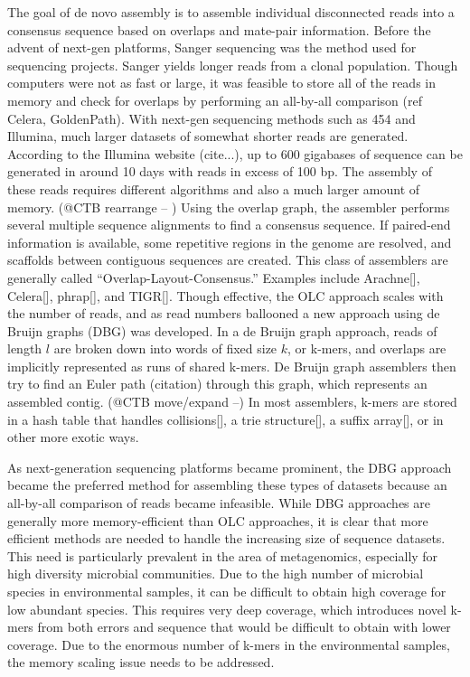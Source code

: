 \documentclass[12pt]{article} \usepackage{simplemargins}
\begin{document}
The goal of de novo assembly is to assemble individual disconnected
reads into a consensus sequence based on overlaps and mate-pair
information. Before the advent of next-gen platforms, Sanger
sequencing was the method used for sequencing projects.  Sanger yields
longer reads from a clonal population.  Though
computers were not as fast or large, it was feasible to
store all of the reads in memory and check for overlaps by performing
an all-by-all comparison (ref Celera, GoldenPath). With next-gen sequencing methods such as 454 and Illumina, much larger datasets of somewhat shorter reads 
are generated. According to the Illumina website (cite...), up to 600 gigabases of sequence can be generated 
in around 10 days with reads in excess of 100 bp. The assembly of these reads requires different
algorithms and also a much larger amount of memory.
(@CTB rearrange -- ) Using the overlap
graph, the assembler performs several multiple sequence alignments to
find a consensus sequence. If paired-end information is available,
some repetitive regions in the genome are resolved, and scaffolds
between contiguous sequences are created. This class of assemblers are
generally called “Overlap-Layout-Consensus.” Examples include
Arachne[], Celera[], phrap[], and TIGR[]. Though effective, the OLC
approach scales with the number of reads, and as read numbers ballooned
a new approach using de Bruijn graphs (DBG) was developed\cite{pmid11504945}.
In a de Bruijn
graph approach, reads of length $l$ are broken down into words of fixed
size $k$, or k-mers, and overlaps are implicitly represented as runs of shared k-mers.
De Bruijn graph assemblers then try to find an Euler path (citation) through
this graph, which represents an assembled contig. (@CTB move/expand --) In most assemblers,
k-mers are stored in a hash table that handles collisions[], a trie
structure[], a suffix array[], or in other more exotic ways.

As next-generation sequencing platforms became prominent, the DBG approach
became the preferred method for assembling these types of datasets
because an all-by-all comparison of reads became infeasible. While DBG
approaches are generally more memory-efficient than OLC approaches, it
is clear that more efficient methods are needed to handle the
increasing size of sequence datasets. This need is particularly
prevalent in the area of metagenomics, especially for high diversity
microbial communities. Due to the high number of microbial species 
in environmental samples, it can be difficult to obtain high coverage for low abundant species. This 
requires very deep coverage, which introduces novel k-mers from both errors and sequence that 
would be difficult to obtain with lower coverage. Due to the enormous number of k-mers in the 
environmental samples, the memory scaling issue needs to be addressed.
\end{document}
